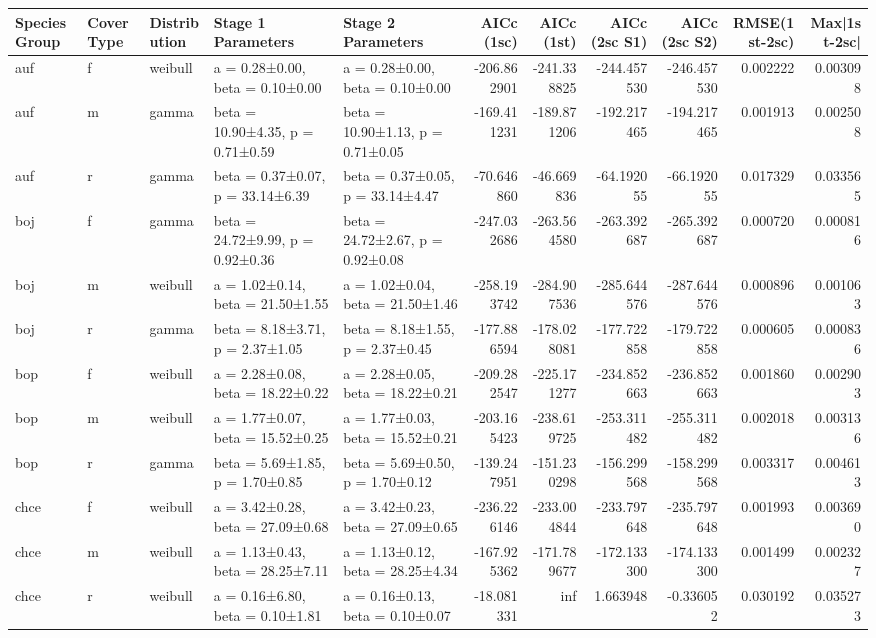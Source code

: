 \begin{tabular}{lllllrrrrrr}
\toprule
Species Group & Cover Type & Distribution & Stage 1 Parameters & Stage 2 Parameters & AICc (1sc) & AICc (1st) & AICc (2sc S1) & AICc (2sc S2) & RMSE(1st-2sc) & Max|1st-2sc| \\
\midrule
auf & f & weibull & a = 0.28±0.00, beta = 0.10±0.00 & a = 0.28±0.00, beta = 0.10±0.00 & -206.862901 & -241.338825 & -244.457530 & -246.457530 & 0.002222 & 0.003098 \\
auf & m & gamma & beta = 10.90±4.35, p = 0.71±0.59 & beta = 10.90±1.13, p = 0.71±0.05 & -169.411231 & -189.871206 & -192.217465 & -194.217465 & 0.001913 & 0.002508 \\
auf & r & gamma & beta = 0.37±0.07, p = 33.14±6.39 & beta = 0.37±0.05, p = 33.14±4.47 & -70.646860 & -46.669836 & -64.192055 & -66.192055 & 0.017329 & 0.033565 \\
boj & f & gamma & beta = 24.72±9.99, p = 0.92±0.36 & beta = 24.72±2.67, p = 0.92±0.08 & -247.032686 & -263.564580 & -263.392687 & -265.392687 & 0.000720 & 0.000816 \\
boj & m & weibull & a = 1.02±0.14, beta = 21.50±1.55 & a = 1.02±0.04, beta = 21.50±1.46 & -258.193742 & -284.907536 & -285.644576 & -287.644576 & 0.000896 & 0.001063 \\
boj & r & gamma & beta = 8.18±3.71, p = 2.37±1.05 & beta = 8.18±1.55, p = 2.37±0.45 & -177.886594 & -178.028081 & -177.722858 & -179.722858 & 0.000605 & 0.000836 \\
bop & f & weibull & a = 2.28±0.08, beta = 18.22±0.22 & a = 2.28±0.05, beta = 18.22±0.21 & -209.282547 & -225.171277 & -234.852663 & -236.852663 & 0.001860 & 0.002903 \\
bop & m & weibull & a = 1.77±0.07, beta = 15.52±0.25 & a = 1.77±0.03, beta = 15.52±0.21 & -203.165423 & -238.619725 & -253.311482 & -255.311482 & 0.002018 & 0.003136 \\
bop & r & gamma & beta = 5.69±1.85, p = 1.70±0.85 & beta = 5.69±0.50, p = 1.70±0.12 & -139.247951 & -151.230298 & -156.299568 & -158.299568 & 0.003317 & 0.004613 \\
chce & f & weibull & a = 3.42±0.28, beta = 27.09±0.68 & a = 3.42±0.23, beta = 27.09±0.65 & -236.226146 & -233.004844 & -233.797648 & -235.797648 & 0.001993 & 0.003690 \\
chce & m & weibull & a = 1.13±0.43, beta = 28.25±7.11 & a = 1.13±0.12, beta = 28.25±4.34 & -167.925362 & -171.789677 & -172.133300 & -174.133300 & 0.001499 & 0.002327 \\
chce & r & weibull & a = 0.16±6.80, beta = 0.10±1.81 & a = 0.16±0.13, beta = 0.10±0.07 & -18.081331 & inf & 1.663948 & -0.336052 & 0.030192 & 0.035273 \\

\end{tabular}
